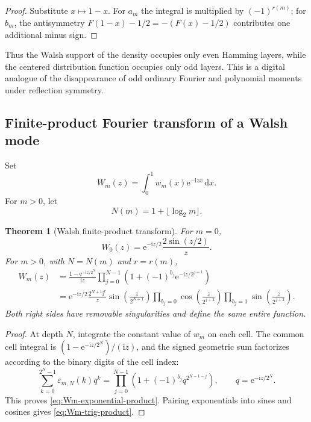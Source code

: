 \documentclass[11pt,oneside]{article}
\newtheorem{theorem}{Theorem}[section]
\theoremstyle{definition}
\theoremstyle{remark}
\newcommand{\e}{\mathrm e}
\newcommand{\ii}{\mathrm i}
\newcommand{\dd}{\,\mathrm d}
\begin{document}
\begin{proof}
Substitute $x\mapsto1-x$.  For $a_m$ the integral is multiplied by
$(-1)^{r(m)}$; for $b_m$, the antisymmetry
$F(1-x)-1/2=-(F(x)-1/2)$ contributes one additional minus sign.
\end{proof}

Thus the Walsh support of the density occupies only even Hamming layers, while
the centered distribution function occupies only odd layers.  This is a
digital analogue of the disappearance of odd ordinary Fourier and polynomial
moments under reflection symmetry.

\subsection{Finite-product Fourier transform of a Walsh mode}

Set
\begin{equation}\label{eq:Wm-def}
 W_m(z)=\int_0^1w_m(x)\e^{-\ii zx}\dd x.
\end{equation}
For $m>0$, let
\begin{equation}\label{eq:Nm-def}
 N(m)=1+\lfloor\log_2m\rfloor.
\end{equation}

\begin{theorem}[Walsh finite-product transform]
\label{thm:Walsh-product-transform}
For $m=0$,
\begin{equation}\label{eq:W0}
 W_0(z)=\e^{-\ii z/2}\frac{2\sin(z/2)}{z}.
\end{equation}
For $m>0$, with $N=N(m)$ and $r=r(m)$,
\begin{align}
 W_m(z)
 &=\frac{1-\e^{-\ii z/2^N}}{\ii z}
   \prod_{j=0}^{N-1}
   \left(1+(-1)^{b_j}\e^{-\ii z/2^{j+1}}\right)
 \label{eq:Wm-exponential-product}\\
 &=\e^{-\ii z/2}\frac{2^{N+1}\ii^r}{z}
   \sin\!\left(\frac{z}{2^{N+1}}\right)
   \prod_{b_j=0}\cos\!\left(\frac{z}{2^{j+2}}\right)
   \prod_{b_j=1}\sin\!\left(\frac{z}{2^{j+2}}\right).
 \label{eq:Wm-trig-product}
\end{align}
Both right sides have removable singularities and define the same entire
function.
\end{theorem}

\begin{proof}
At depth $N$, integrate the constant value of $w_m$ on each cell.  The common
cell integral is $(1-\e^{-\ii z/2^N})/(\ii z)$, and the signed geometric sum
factorizes according to the binary digits of the cell index:
\[
 \sum_{k=0}^{2^N-1}\varepsilon_{m,N}(k)q^k
 =\prod_{j=0}^{N-1}\left(1+(-1)^{b_j}q^{2^{N-1-j}}\right),
 \qquad q=\e^{-\ii z/2^N}.
\]
This proves \eqref{eq:Wm-exponential-product}.  Pairing exponentials into sines
and cosines gives \eqref{eq:Wm-trig-product}.
\end{proof}
\end{document}
